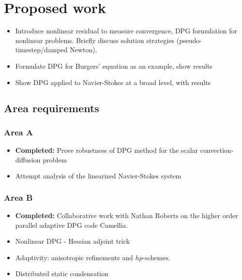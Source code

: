 \documentclass{report}
\begin{document}


\chapter{Proposed work}

\begin{itemize}
\item Introduce nonlinear residual to measure convergence, DPG formulation for nonlinear problems. Briefly discuss solution strategies (pseudo-timestep/damped Newton). 
\item Formulate DPG for Burgers' equation as an example, show results
\item Show DPG applied to Navier-Stokes at a broad level, with results
\end{itemize}





\section{Area requirements}

\subsection{Area A}

\begin{itemize}
\item{\textbf{Completed: }} Prove robustness of DPG method for the scalar convection-diffusion problem
\item Attempt analysis of the linearized Navier-Stokes system
\end{itemize}

\subsection{Area B}

\begin{itemize}
\item{\textbf{Completed: }} Collaborative work with Nathan Roberts on the higher order parallel adaptive DPG code Camellia.
\item Nonlinear DPG - Hessian adjoint trick
\item Adaptivity: anisotropic refinements and $hp$-schemes.
\item Distributed static condensation
\end{itemize}
\end{document}
